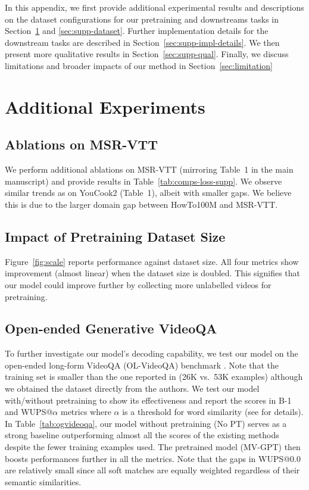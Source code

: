 \documentclass[10pt,twocolumn,letterpaper]{article}
\begin{document}
In this appendix, we first provide additional experimental results and  descriptions on the dataset configurations for our pretraining and downstreams tasks in Section~\ref{sec:add_exps} and \ref{sec:supp-dataset}.
Further implementation details for the downstream tasks are described in Section~\ref{sec:supp-impl-details}.
We then present more qualitative results in Section~\ref{sec:supp-qual}.
Finally, we discuss limitations and broader impacts of our method in Section~\ref{sec:limitation} 

\section{Additional Experiments}
\label{sec:add_exps}

\subsection{Ablations on MSR-VTT}
We perform additional ablations on MSR-VTT (mirroring Table~1 in the main manuscript) and provide results in 
Table~\ref{tab:comps-loss-supp}. We observe similar trends as on YouCook2 (Table~1), albeit with smaller gaps. We believe this is due to the larger domain gap between HowTo100M and MSR-VTT. 

\subsection{Impact of Pretraining Dataset Size} \label{sec:supp-ds_size}


Figure~\ref{fig:scale} reports performance against dataset size. 
All four metrics show improvement (almost linear) when the dataset size is doubled. 
This signifies that our model could improve further by collecting more unlabelled videos for pretraining.

\subsection{Open-ended Generative VideoQA}
To further investigate our model's decoding capability, we test our model on the open-ended long-form VideoQA (OL-VideoQA) benchmark \cite{zhang2019open}.
Note that the training set is smaller than the one reported in \cite{zhang2019open} (26K vs.\ 53K examples) although we obtained the dataset directly from the authors.
We test our model with/without pretraining to show its effectiveness and report the scores in B-1 and WUPS@$\alpha$ metrics where $\alpha$ is a threshold for word similarity (see \cite{zhang2019open} for details).
In Table~\ref{tab:ogvideoqa}, our model without pretraining (No PT) serves as a strong baseline outperforming almost all the scores of the existing methods despite the fewer training examples used.
The pretrained model (MV-GPT) then boosts performances further in all the metrics.
Note that the gaps in WUPS@0.0 are relatively small since all soft matches are equally weighted regardless of their semantic similarities.
\end{document}

